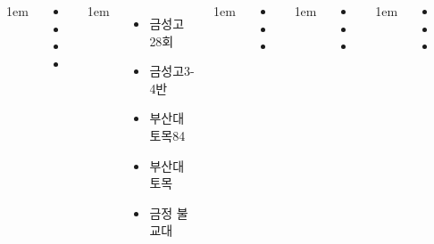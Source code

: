 \documentclass[	20pt, 
							a1paper, 
							portrait, %
							margin=0mm, %
							innermargin=10mm,  		%
							colspace=5mm, 
							subcolspace=0mm
							]{tikzposter}
\begin{document}
\begin{columns}
{\begin{itemize}
					\end{itemize}
			}



			{
					\setlength{\leftmargini}{14em}
					\setlength{\labelsep} {1em}
					\begin{itemize}
					\item [동대 신경]
					\item [메리놀 이비인후과] 
					\item [메리놀 비뇨기과] 
					\item [노블 치과] 
					\end{itemize}
			}


			{
					\setlength{\leftmargini}{4em}
					\setlength{\labelsep} {1em}
					\begin{itemize}
					\item  금성고28회
					\item  금성고3-4반 
					\item  부산대 토목84
					\item  부산대 토목
					\item  금정 불교대
					\end{itemize}
			} %


			{
					\setlength{\leftmargini}{4em}
					\setlength{\labelsep} {1em}
					\begin{itemize}
					\item  
					\item  
					\item  
					\end{itemize}
			} %

			{
					\setlength{\leftmargini}{4em}
					\setlength{\labelsep} {1em}
					\begin{itemize}
					\item  
					\item  
					\item  
					\end{itemize}
			} %


			{
					\setlength{\leftmargini}{4em}
					\setlength{\labelsep} {1em}
					\begin{itemize}
					\item  
					\item  
					\item  
					\end{itemize}
			} %


	\end{columns}
\end{document}
